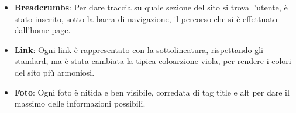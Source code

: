 \begin{itemize}
    \item \textbf{Breadcrumbs}: Per dare traccia su quale sezione del sito si trova l'utente, \`e stato inserito, sotto la barra di navigazione, il percorso che si \`e effettuato dall'home page.

    \item \textbf{Link}: Ogni link \`e rappresentato con la sottolineatura, rispettando gli standard, ma \`e stata cambiata la tipica coloarzione viola, per rendere i colori del sito pi\`u armoniosi.

    \item \textbf{Foto}: Ogni foto \`e nitida e ben visibile, corredata di tag title e alt per dare il massimo delle informazioni possibili.

\end{itemize}
